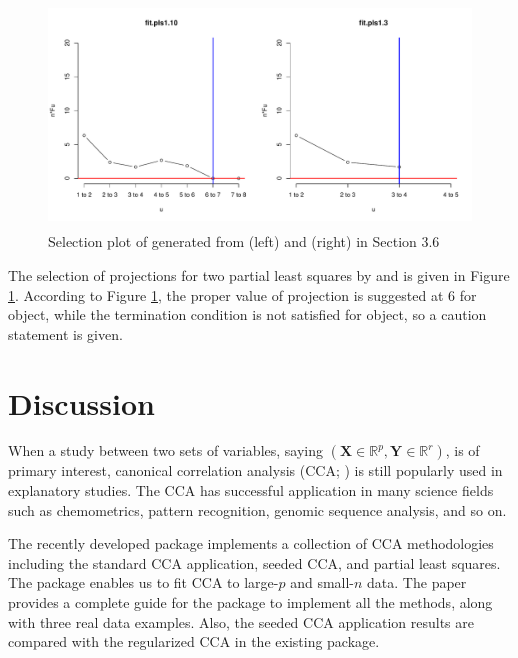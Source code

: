 %
\begin{figure}\begin{center}
\includegraphics[width=12cm,height=6cm]{pls_selu.pdf}
\vspace{-5mm}\caption{Selection plot of   generated from
(left) and
(right)
 in Section 3.6}
\label{pls_selu}
\end{center}\end{figure}
%

The selection of projections for two partial least squares by
 and
is given in Figure \ref{pls_selu}.
According to Figure \ref{pls_selu}, the proper value of projection is suggested at 6
for  object, while the termination condition is not satisfied  for  object,
so a caution statement is given.


\section{Discussion}
When a study between two sets of variables,
saying $(\mathbf{X}\in\mathbb{R}^{p}, \mathbf{Y}\in\mathbb{R}^{r})$,
is of primary interest,
canonical correlation analysis (CCA; \cite{cca}) is still
popularly used in explanatory studies.
The CCA has successful application in many science fields
such as chemometrics, pattern recognition, genomic sequence analysis, and so on.

The recently developed  package implements
a collection of CCA methodologies
including the standard CCA application, seeded CCA, and partial least squares.
The package enables us to fit CCA to large-$p$ and small-$n$ data.
The paper provides a complete guide for
the package to implement all the methods, along with three real data examples.
Also, the seeded CCA application results are compared
with the regularized CCA in the existing  package.

